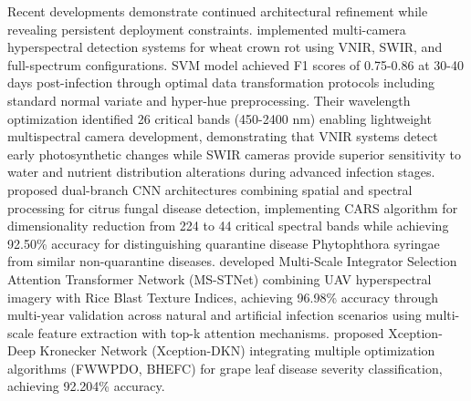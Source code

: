 \documentclass[sn-mathphys]{sn-jnl}
\theoremstyle{thmstyleone}%
\theoremstyle{thmstyletwo}%
\theoremstyle{thmstylethree}%
\begin{document}
Recent developments demonstrate continued architectural refinement while revealing persistent deployment constraints. \citet{xie2024hyperspectral} implemented multi-camera hyperspectral detection systems for wheat crown rot using VNIR, SWIR, and full-spectrum configurations. SVM model achieved F1 scores of 0.75-0.86 at 30-40 days post-infection through optimal data transformation protocols including standard normal variate and hyper-hue preprocessing. Their wavelength optimization identified 26 critical bands (450-2400 nm) enabling lightweight multispectral camera development, demonstrating that VNIR systems detect early photosynthetic changes while SWIR cameras provide superior sensitivity to water and nutrient distribution alterations during advanced infection stages. \citet{yu2025detection} proposed dual-branch CNN architectures combining spatial and spectral processing for citrus fungal disease detection, implementing CARS algorithm for dimensionality reduction from 224 to 44 critical spectral bands while achieving 92.50\% accuracy for distinguishing quarantine disease Phytophthora syringae from similar non-quarantine diseases. \citet{liu2025early} developed Multi-Scale Integrator Selection Attention Transformer Network (MS-STNet) combining UAV hyperspectral imagery with Rice Blast Texture Indices, achieving 96.98\% accuracy through multi-year validation across natural and artificial infection scenarios using multi-scale feature extraction with top-k attention mechanisms. \citet{swaraj2025xception} proposed Xception-Deep Kronecker Network (Xception-DKN) integrating multiple optimization algorithms (FWWPDO, BHEFC) for grape leaf disease severity classification, achieving 92.204\% accuracy.
\end{document}
